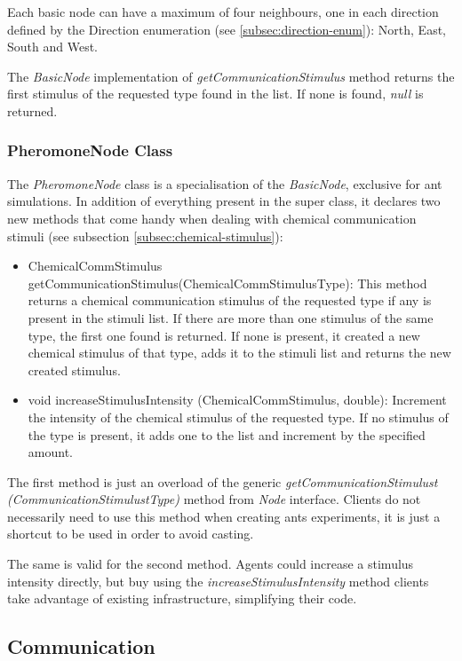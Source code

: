 Each basic node can have a maximum of four neighbours, one in each direction defined by the Direction enumeration (see \ref{subsec:direction-enum}): North, East, South and West.

The \emph{BasicNode} implementation of \emph{getCommunicationStimulus} method returns the first stimulus of the requested type found in the list. If none is found, \emph{null} is returned.

\subsubsection{PheromoneNode Class}

The \emph{PheromoneNode} class is a specialisation of the \emph{BasicNode}, exclusive for ant simulations. In addition of everything present in the super class, it declares two new methods that come handy when dealing with chemical communication stimuli (see subsection \ref{subsec:chemical-stimulus}):

\begin{itemize}
  \item ChemicalCommStimulus getCommunicationStimulus(ChemicalCommStimulusType): This method returns a chemical communication stimulus of the requested type if any is present in the stimuli list. If there are more than one stimulus of the same type, the first one found is returned. If none is present, it created a new chemical stimulus of that type, adds it to the stimuli list and returns the new created stimulus.

  \item void increaseStimulusIntensity (ChemicalCommStimulus, double): Increment the intensity of the chemical stimulus of the requested type. If no stimulus of the type is present, it adds one to the list and increment by the specified amount.
\end{itemize}

The first method is just an overload of the generic \emph{getCommunicationStimulust (CommunicationStimulustType)} method from \emph{Node} interface. Clients do not necessarily need to use this method when creating ants experiments, it is just a shortcut to be used in order to avoid casting.

The same is valid for the second method. Agents could increase a stimulus intensity directly, but buy using the \emph{increaseStimulusIntensity} method clients take advantage of existing infrastructure, simplifying their code.

\subsection {Communication}
\label{subsec:comm-stimulus}

